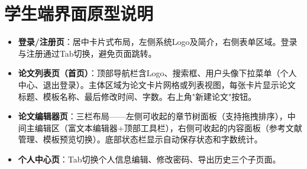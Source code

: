 \section{学生端界面原型说明}

\begin{itemize}
    \item \textbf{登录/注册页}：居中卡片式布局，左侧系统Logo及简介，右侧表单区域。登录与注册通过Tab切换，避免页面跳转。
    \item \textbf{论文列表页（首页）}：顶部导航栏含Logo、搜索框、用户头像下拉菜单（个人中心、退出登录）。主体区域为论文卡片网格或列表视图，每张卡片显示论文标题、模板名称、最后修改时间、字数。右上角"新建论文"按钮。
    \item \textbf{论文编辑器页}：三栏布局——左侧可收起的章节树面板（支持拖拽排序），中间主编辑区（富文本编辑器+顶部工具栏），右侧可收起的内容面板（参考文献管理、模板预览切换）。底部状态栏显示自动保存状态和字数统计。
    \item \textbf{个人中心页}：Tab切换个人信息编辑、修改密码、导出历史三个子页面。
\end{itemize}
